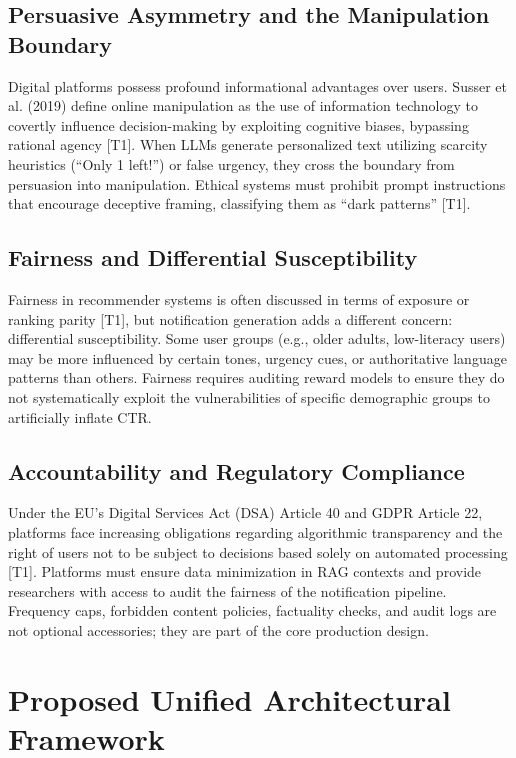 \documentclass[sigconf]{acmart}
\begin{document}
\subsection{Persuasive Asymmetry and the Manipulation Boundary}

Digital platforms possess profound informational advantages over users. Susser et al. (2019) define online manipulation as the use of information technology to covertly influence decision-making by exploiting cognitive biases, bypassing rational agency \cite{susser2019technology} [T1]. When LLMs generate personalized text utilizing scarcity heuristics (``Only 1 left!'') or false urgency, they cross the boundary from persuasion into manipulation. Ethical systems must prohibit prompt instructions that encourage deceptive framing, classifying them as ``dark patterns'' \cite{mathur2021what} [T1].

\subsection{Fairness and Differential Susceptibility}

Fairness in recommender systems is often discussed in terms of exposure or ranking parity \cite{wang2023survey} [T1], but notification generation adds a different concern: differential susceptibility. Some user groups (e.g., older adults, low-literacy users) may be more influenced by certain tones, urgency cues, or authoritative language patterns than others. Fairness requires auditing reward models to ensure they do not systematically exploit the vulnerabilities of specific demographic groups to artificially inflate CTR.

\subsection{Accountability and Regulatory Compliance}

Under the EU's Digital Services Act (DSA) Article 40 and GDPR Article 22, platforms face increasing obligations regarding algorithmic transparency and the right of users not to be subject to decisions based solely on automated processing \cite{fabbri2023ethical} [T1]. Platforms must ensure data minimization in RAG contexts and provide researchers with access to audit the fairness of the notification pipeline. Frequency caps, forbidden content policies, factuality checks, and audit logs are not optional accessories; they are part of the core production design.

\section{Proposed Unified Architectural Framework}
\end{document}
